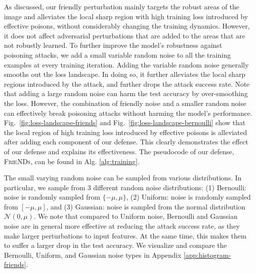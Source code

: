\documentclass{article}
\newcommand{\alg}{\textsc{FrieNDs}}
\newcommand{\figref}[1]{Fig.~\ref{#1}}
\begin{document}
As discussed, our friendly perturbation mainly targets the robust areas of the image and alleviates the local sharp region with high training loss introduced by effective poisons, %
without considerably changing the training dynamics. However, it does not affect  adversarial perturbations that are added to the areas that are not robustly learned.
To further improve the model's robustness against poisoning attacks, we add a small variable random noise to all the training examples at every training iteration. %
Adding the variable random noise generally smooths out the loss landscape. In doing so, it further alleviates the local sharp regions introduced by the attack,
and further drops the attack success rate.
Note that adding a large random noise can harm the test accuracy by over-smoothing the loss. However, the combination of friendly noise and a smaller random noise can effectively break poisoning attacks without harming the model's performance.
\figref{fig:loss-landscape-friends} and \figref{fig:loss-landscape-bernoulli} show that
the local region of high training loss introduced by effective poisons is alleviated
after adding each component of our defense.  This clearly demonstrates the effect of our defense and explains its effectiveness. 
The pseudocode of our defense, \alg, can be found in Alg. \ref{alg:training}.

The small varying random noise can be sampled from various distributions. In particular, we sample from 3 different random noise distributions: (1) Bernoulli: noise is randomly sampled from $\{-\mu, \mu\}$, (2) Uniform: noise is randomly sampled from $[-\mu, \mu]$, and (3) Gaussian: noise is sampled from the normal distribution $\mathcal{N}(0, \mu)$. We note that compared to Uniform noise, Bernoulli and Gaussian noise are in general more effective at reducing the attack success rate, as they make larger perturbations to
input features. At the same time, this makes %
them to suffer a larger drop in the test accuracy. We visualize and compare the Bernoulli, Uniform, and Gaussian noise types in Appendix \ref{app:histogram-friends}.



 
\end{document}
